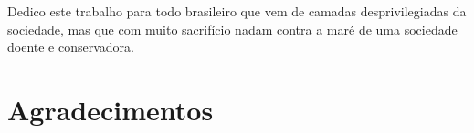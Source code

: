 \capaime[port]

%




\begin{dedicatoria}
Dedico este trabalho para todo brasileiro que vem de camadas desprivilegiadas da sociedade, mas que com muito sacrifício nadam contra a maré de uma sociedade doente e conservadora. 
\end{dedicatoria}

\hypersetup{pageanchor=true}


\chapter*{Agradecimentos}

